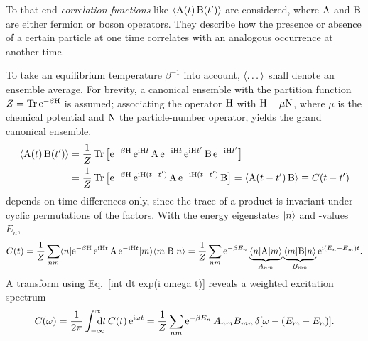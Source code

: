 To that end \emph{correlation functions} like $\langle\mathrm A(t) \, \mathrm B(t')\rangle$ are
considered, where $\mathrm A$ and $\mathrm B$ are either fermion or boson operators.
They describe how the presence or absence of a certain particle at one time
correlates with an analogous occurrence at another time.

To take an equilibrium temperature $\beta^{-1}$ into account, $\langle\dots\rangle$ shall
denote an ensemble average. For brevity, a canonical ensemble with the partition
function $Z = \operatorname{Tr} \mathrm e^{-\beta \mathrm H}$ is assumed; associating the 
operator $\mathrm H$ with $\mathrm H - \mu \mathrm N$, where $\mu$ is the chemical potential
and $\mathrm N$ the particle-number operator, yields the grand canonical ensemble.
%
\begin{equation} \label{C(t)}
    \begin{split}
        \langle\mathrm A(t) \, \mathrm B(t')\rangle &= \frac 1 Z \operatorname{Tr}
        \big[
            \mathrm e^{-\beta \mathrm H} \,
            \mathrm e^{\mathrm i \mathrm H t} \, \mathrm A \, \mathrm e^{-\mathrm i \mathrm H t} \,
            \mathrm e^{\mathrm i \mathrm H t'} \, \mathrm B \, \mathrm e^{-\mathrm i \mathrm H t'}
        \big]
        \\
        &= \frac 1 Z \operatorname{Tr}
        \big[
            \mathrm e^{-\beta \mathrm H} \,
            \mathrm e^{\mathrm i \mathrm H (t - t')} \, \mathrm A \, \mathrm e^{-\mathrm i \mathrm H (t - t')} \, \mathrm B
        \big]
        = \langle\mathrm A(t - t') \, \mathrm B\rangle \equiv C(t - t')
    \end{split}
\end{equation}
%
depends on time differences only, since the trace of a product is invariant
under cyclic permutations of the factors. With the energy eigenstates $|n\rangle$
and -values $E_n$,
%
\begin{equation} \label{C(t) in energy basis}
    C(t) = \frac 1 Z \sum_{n m} \langle n|
    \mathrm e^{-\beta \mathrm H} \, \mathrm e^{\mathrm i \mathrm H t} \, \mathrm A \, \mathrm e^{-\mathrm i \mathrm H t}
    |m\rangle \langle m| \mathrm B |n\rangle =
    \frac 1 Z \sum_{n m} \mathrm e^{-\beta E_n}
    \underbrace{\langle n| \mathrm A |m\rangle}_{A_{n m}}
    \underbrace{\langle m| \mathrm B |n\rangle}_{B_{m n}}
    \mathrm e^{\mathrm i (E_n - E_m) t}.
\end{equation}
%
A  transform using Eq.~\ref{int dt exp(i omega t)} reveals a
weighted excitation spectrum
%
\begin{equation} \label{C(omega)}
    C(\omega) = \frac 1 {2 \pi} \int \from{-\infty} \till \infty \D t \,
    C(t) \, \E^{\I \omega t} =
    \frac 1 Z \sum_{n m} \E^{-\beta E_n} \, A_{n m} B_{m n} \,
    \delta[\omega - (E_m - E_n)].
\end{equation}

